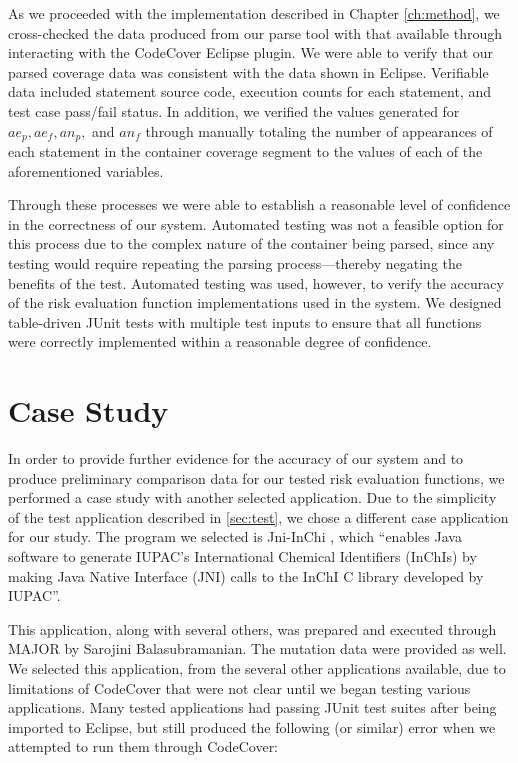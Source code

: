 As we proceeded with the implementation described in Chapter \ref{ch:method}, we cross-checked
the data produced from our parse tool with that available through interacting with the CodeCover
Eclipse plugin.  We were able to verify that our parsed coverage data was consistent
with the data shown in Eclipse.  Verifiable data included statement source code, execution 
counts for each statement, and test case pass/fail status.  In addition, we verified the values
generated for $ae_p, ae_f, an_p,$ and $an_f$ through manually totaling the number of appearances 
of each statement in the container coverage segment to the values of each of the aforementioned
variables.  

Through these processes we were able to establish a reasonable level of confidence
in the correctness of our system.  Automated testing was not a feasible option for this process
due to the complex nature of the container being parsed, since any testing would require 
repeating the parsing process---thereby negating the benefits of the test.  Automated testing
was used, however, to verify the accuracy of the risk evaluation function implementations
used in the system.  We designed table-driven JUnit tests with multiple test inputs to 
ensure that all functions were correctly implemented within a reasonable degree of confidence.

\section{Case Study}\label{sec:case}

In order to provide further evidence for the accuracy of our system and to produce preliminary 
comparison data for our tested risk evaluation functions, we performed a case study with another
selected application. Due to the simplicity of the test application described in \ref{sec:test}, 
we chose a different case application for our study.  The program we selected is Jni-InChi
\cite{jniinchi}, which ``enables Java software to generate IUPAC's International Chemical Identifiers 
(InChIs) by making Java Native Interface (JNI) calls to the InChI C library developed by IUPAC''.

This application, along with several others, was prepared and executed through MAJOR by Sarojini
Balasubramanian.  The mutation data were provided as well.  We selected this application, from the
several other applications available, due to limitations of CodeCover that were not clear until we
began testing various applications.  Many tested applications had passing JUnit test suites after
being imported to Eclipse, but still produced the following (or similar) error when we attempted
to run them through CodeCover:


